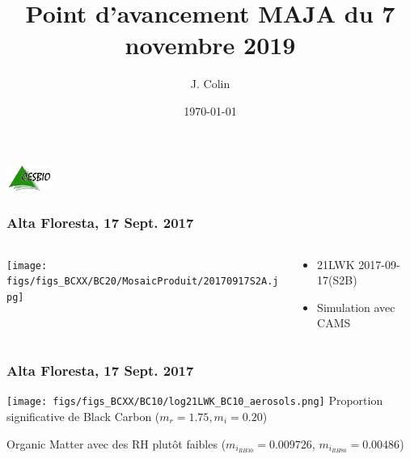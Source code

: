 \documentclass[8pt]{beamer}
\title{Point d'avancement MAJA du 7 novembre 2019}
\author{J. Colin\inst{1}}%
\institute{\inst{1}Centre d'\'Etudes Spatiales de la Biosph\`ere, France \url{jerome.colin@cesbio.cnes.fr}\\
}
\date{\today} %
\begin{document}
{
	\begin{frame}
		\vspace{.8cm}
		\includegraphics[width=1.5cm]{logo_cesbio_transp.pdf}
	\titlepage %
	\end{frame}
}



\begin{frame}
\frametitle{Alta Floresta, 17 Sept. 2017}
	
	\begin{columns}
		\begin{column}{0.7\textwidth}
			\begin{center}
				
		     	\texttt{[image: figs/figs\_BCXX/BC20/MosaicProduit/20170917S2A.jpg]}
		    \end{center}		
		\end{column}
		\begin{column}{0.3\textwidth}
			\begin{center}
				\begin{itemize}
					\item 21LWK 2017-09-17(S2B)
					\item Simulation avec CAMS
				\end{itemize}
		    \end{center}		
		\end{column}
	\end{columns}
\end{frame}

\begin{frame}
\frametitle{Alta Floresta, 17 Sept. 2017}
	\texttt{[image: figs/figs\_BCXX/BC10/log21LWK\_BC10\_aerosols.png]}
	Proportion significative de Black Carbon ($m_{r}=1.75, m_{i}=0.20$)
	
	Organic Matter avec des RH plutôt faibles ($m_{i_{RH30}}=0.009726$, $m_{i_{RH80}}=0.00486$)
\end{frame}
\end{document}
